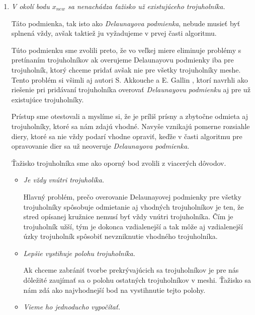 \begin{enumerate}
     \item{
         \textit{V okolí bodu $x_{new}$ sa nenachádza ťažisko už existujúceho trojuholníka.}

         Táto podmienka, tak isto ako \textit{Delaunayova podmienka}, nebude musieť byť splnená vždy,
         avšak taktiež ju vyžadujeme v prvej časti algoritmu. 
         
         Túto podmienku sme zvolili preto, že vo veľkej miere eliminuje problémy s pretínaním 
         trojuholníkov ak overujeme Delaunayovu podmienky iba pre trojuholník, ktorý chceme pridať 
         avšak nie pre všetky trojuholníky meshe. Tento problém si všimli aj autori S. Akkouche a 
         E. Gallin \cite{akkouche2001adaptive}, ktorí navrhli ako riešenie pri pridávaní trojuholníka 
         overovať \textit{Delaunayovu podmienku} aj pre už existujúce trojuholníky. 
         
         Prístup sme otestovali a myslíme si, že je príliš prísny a zbytočne odmieta aj trojuholníky, 
         ktoré sa nám zdajú vhodné. Navyše vznikajú pomerne rozsiahle diery, ktoré sa nie vždy podarí 
         vhodne opraviť, keďže v časti algoritmu pre opravovanie dier sa už neoveruje
         \textit{Delaunayova podmienka}.

         Ťažisko trojuholníka sme ako oporný bod zvolili z viacerých dôvodov.
         \begin{itemize}
            \item{
                \textit{Je vždy vnútri trojuholíka.}

                Hlavný problém, prečo overovanie Delaunayovej podmienky pre všetky trojuholníky spôsobuje
                odmietanie aj vhodných trojuholníkov je ten, že stred opísanej kružnice nemusí byť vždy
                vnútri trojuholníka. Čím je trojuholník užší, tým je dokonca vzdialenejší a tak môže aj
                vzdialenejší úzky trojuholník spôsobiť nevzniknutie vhodného trojuholníka. 
            }
            \item{
                \textit{Lepšie vystihuje polohu trojuholníka.}

                Ak chceme zabrániť tvorbe prekrývajúcich sa trojuholníkov je pre nás dôležité zaujímať sa 
                o polohu ostatných trojuholníkov v meshi. Ťažisko sa nám zdá ako najvhodnejší bod na 
                vystihnutie tejto polohy.
            }
            \item{
                \textit{Vieme ho jednoducho vypočítať.}

}
\end{itemize}}
\end{enumerate}
